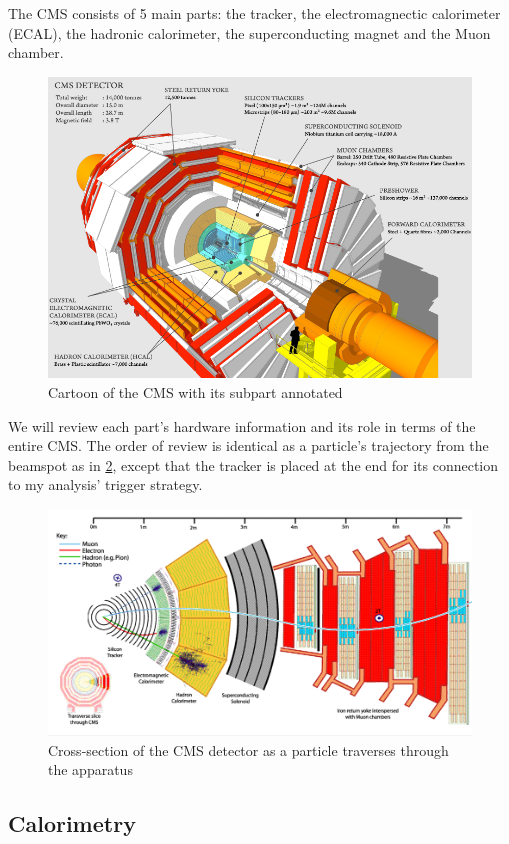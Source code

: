 The CMS consists of 5 main parts: the tracker, the electromagnectic calorimeter (ECAL), the hadronic calorimeter, the superconducting magnet and the Muon chamber.
\begin{figure}[h!]
	\caption{Cartoon of the CMS with its subpart annotated \cite{xsec}}
  \label{fig:CMS}
  \centering
  \includegraphics[width=0.87\linewidth]{figs/CMS.png}
\end{figure}
We will review each part's hardware information and its role in terms of the entire CMS.
The order of review is identical as a particle's trajectory from the beamspot as in \ref{fig:cmsxsec}, except that the tracker is placed at the end for its connection to my analysis' trigger strategy.
\begin{figure}[h!]
  \caption{Cross-section of the CMS detector as a particle traverses through the apparatus \cite{xsec}}
  \label{fig:cmsxsec}
  \centering
  \includegraphics[width=0.87\linewidth]{figs/cmsxsec.png}
\end{figure}
\subsection{Calorimetry}
